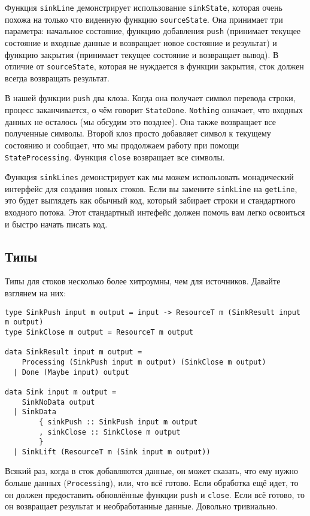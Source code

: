 {Функция \lstinline=sinkLine= демонстрирует использование \lstinline=sinkState=, которая
очень похожа на только что
виденную функцию \lstinline=sourceState=. Она принимает три параметра: начальное
состояние,
функцию добавления \verb=push= 
(принимает текущее состояние и входные данные и возвращает новое состояние и результат)
и функцию закрытия (принимает текущее состояние и возвращает вывод).
В отличие от \lstinline=sourceState=, которая не нуждается в функции закрытия, сток
должен всегда возвращать результат.

В нашей функции \lstinline=push= два клоза. Когда она получает символ перевода строки,
процесс заканчивается, о чём говорит \lstinline=StateDone=. \lstinline=Nothing= означает,
что
входных данных не
осталось (мы обсудим это позднее). Она также возвращает все полученные символы. Второй
клоз просто добавляет символ к текущему состоянию и сообщает, что мы продолжаем работу
при помощи \lstinline=StateProcessing=. Функция \lstinline=close= возвращает все символы.

Функция \lstinline=sinkLines= демонстрирует как мы можем использовать монадический
интерфейс для создания новых стоков. Если вы замените \lstinline=sinkLine= на
\lstinline=getLine=, это будет выглядеть
как обычный код, который забирает строки и стандартного входного потока. Этот
стандартный интефейс должен помочь вам легко освоиться и быстро начать писать код.

\subsection{Типы}

Типы для стоков несколько более хитроумны, чем для источников. Давайте взглянем на них:
\begin{lstlisting}
type SinkPush input m output = input -> ResourceT m (SinkResult input m output)
type SinkClose m output = ResourceT m output

data SinkResult input m output =
    Processing (SinkPush input m output) (SinkClose m output)
  | Done (Maybe input) output

data Sink input m output =
    SinkNoData output
  | SinkData
        { sinkPush :: SinkPush input m output
        , sinkClose :: SinkClose m output
        }
  | SinkLift (ResourceT m (Sink input m output))
\end{lstlisting}  
Всякий раз, когда в сток добавляются данные, он может сказать, что ему нужно больше
данных (\lstinline{Processing}), или, что всё готово. Если обработка ещё идет, то он должен предоставить
обновлённые функции \lstinline{push} и \lstinline{close}. Если всё готово, то он возвращает результат и
необработанные данные. Довольно тривиально.
 
}
